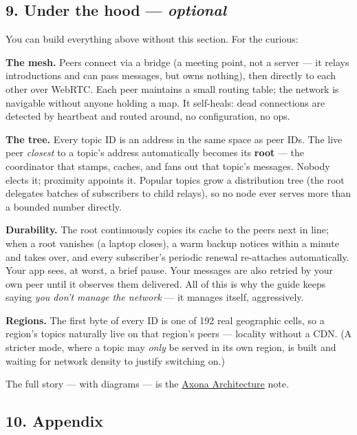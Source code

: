 \documentclass[
  nobib]{tufte-handout}
\begin{document}
\subsection{\texorpdfstring{9. Under the hood ---
\emph{optional}}{9. Under the hood --- optional}}\label{under-the-hood-optional}

You can build everything above without this section. For the curious:

\textbf{The mesh.} Peers connect via a bridge (a meeting point, not a
server --- it relays introductions and can pass messages, but owns
nothing), then directly to each other over WebRTC. Each peer maintains a
small routing table; the network is navigable without anyone holding a
map. It self-heals: dead connections are detected by heartbeat and
routed around, no configuration, no ops.

\textbf{The tree.} Every topic ID is an address in the same space as
peer IDs. The live peer \emph{closest} to a topic's address
automatically becomes its \textbf{root} --- the coordinator that stamps,
caches, and fans out that topic's messages. Nobody elects it; proximity
appoints it. Popular topics grow a distribution tree (the root delegates
batches of subscribers to child relays), so no node ever serves more
than a bounded number directly.

\textbf{Durability.} The root continuously copies its cache to the peers
next in line; when a root vanishes (a laptop closes), a warm backup
notices within a minute and takes over, and every subscriber's periodic
renewal re-attaches automatically. Your app sees, at worst, a brief
pause. Your messages are also retried by your own peer until it observes
them delivered. All of this is why the guide keeps saying \emph{you
don't manage the network} --- it manages itself, aggressively.

\textbf{Regions.} The first byte of every ID is one of 192 real
geographic cells, so a region's topics naturally live on that region's
peers --- locality without a CDN. (A stricter mode, where a topic may
\emph{only} be served in its own region, is built and waiting for
network density to justify switching on.)

The full story --- with diagrams --- is the
\href{../architecture/Axona-Architecture.tex}{Axona Architecture} note.

\subsection{10. Appendix}\label{appendix}
\end{document}
